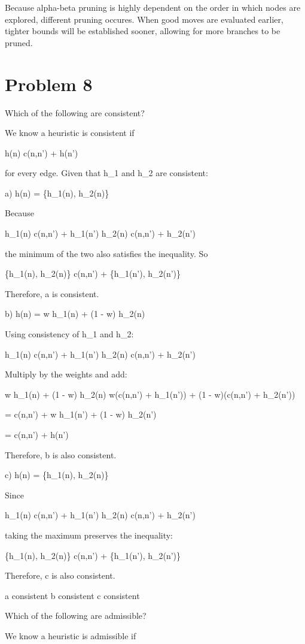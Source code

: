 \documentclass{article}
\begin{document}
Because alpha-beta pruning is highly dependent on the order in which nodes are explored, different pruning occures. When good moves are evaluated earlier, tighter bounds will be established sooner, allowing for more branches to be pruned.
\section*{Problem 8}
Which of the following are consistent?

We know a heuristic is consistent if

h(n) \le c(n,n') + h(n')

for every edge. Given that h_1 and h_2 are consistent:

a) h(n) = \min\{h_1(n), h_2(n)\}

Because

h_1(n) \le c(n,n') + h_1(n')  
h_2(n) \le c(n,n') + h_2(n')

the minimum of the two also satisfies the inequality. So

\min\{h_1(n), h_2(n)\} \le c(n,n') + \min\{h_1(n'), h_2(n')\}

Therefore, a is consistent.

b) h(n) = w h_1(n) + (1 - w) h_2(n)

Using consistency of h_1 and h_2:

h_1(n) \le c(n,n') + h_1(n')  
h_2(n) \le c(n,n') + h_2(n')

Multiply by the weights and add:

w h_1(n) + (1 - w) h_2(n)
\le w(c(n,n') + h_1(n')) + (1 - w)(c(n,n') + h_2(n'))

= c(n,n') + w h_1(n') + (1 - w) h_2(n')

= c(n,n') + h(n')

Therefore, b is also consistent.

c) h(n) = \max\{h_1(n), h_2(n)\}

Since

h_1(n) \le c(n,n') + h_1(n')  
h_2(n) \le c(n,n') + h_2(n')

taking the maximum preserves the inequality:

\max\{h_1(n), h_2(n)\} \le c(n,n') + \max\{h_1(n'), h_2(n')\}

Therefore, c is also consistent.

a consistent  
b consistent  
c consistent


Which of the following are admissible?

We know a heuristic is admissible if
\end{document}
